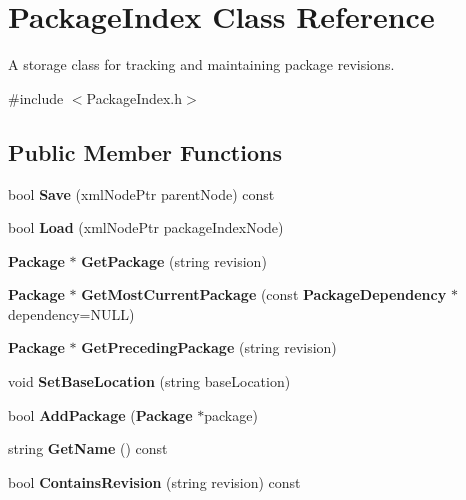 \section{PackageIndex Class Reference}
\label{classPackageIndex}


A storage class for tracking and maintaining package revisions.  




{\ttfamily \#include $<$PackageIndex.h$>$}

\subsection*{Public Member Functions}
\begin{DoxyCompactItemize}
\item 
bool {\bf Save} (xmlNodePtr parentNode) const 
\item 
bool {\bf Load} (xmlNodePtr packageIndexNode)
\item 
{\bf Package} $\ast$ {\bf GetPackage} (string revision)
\item 
{\bf Package} $\ast$ {\bf GetMostCurrentPackage} (const {\bf PackageDependency} $\ast$dependency=NULL)
\item 
{\bf Package} $\ast$ {\bf GetPrecedingPackage} (string revision)
\item 
void {\bf SetBaseLocation} (string baseLocation)
\item 
bool {\bf AddPackage} ({\bf Package} $\ast$package)
\item 
string {\bf GetName} () const 
\item 
bool {\bf ContainsRevision} (string revision) const 
\end{DoxyCompactItemize}
